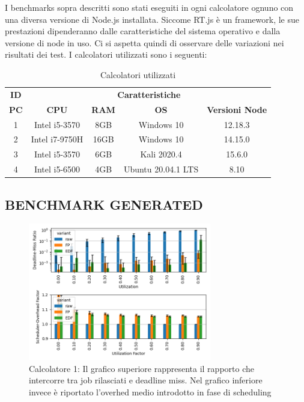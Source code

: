 \documentclass[conference]{IEEEtran}
\begin{document}
I benchmarks sopra descritti sono stati eseguiti in ogni calcolatore ognuno con una diversa versione di Node.js installata. Siccome RT.js è un framework, le sue prestazioni dipenderanno dalle caratteristiche del sistema operativo e dalla versione di node in uso. Ci si aspetta quindi di osservare delle variazioni nei risultati dei test.
\newline 
I calcolatori utilizzati sono i seguenti:
\begin{table}[htbp]
\begin{center}
\begin{tabular}{|c|c|c|c|c|}
\hline
\textbf{ID}&\multicolumn{4}{|c|}{\textbf{Caratteristiche}} \\
\cline{2-5} 
\textbf{PC} & \textbf{CPU} & \textbf{RAM} & \textbf{OS} & \textbf{Versioni Node} \\
\hline
1 & Intel i5-3570 & 8GB & Windows 10 & 12.18.3  \\
2 & Intel i7-9750H & 16GB & Windows 10 & 14.15.0 \\
3 & Intel i5-3570 & 6GB & Kali 2020.4 & 15.6.0 \\
4 & Intel i5-6500 & 4GB & Ubuntu 20.04.1 LTS & 8.10 \\
\hline
\end{tabular}
\caption{Calcolatori utilizzati}
\end{center}
\end{table}

    \subsection{BENCHMARK GENERATED}
    \begin{figure}[hbt!]
    \includegraphics[width=8cm]{generated_1.png}
    \centering
    \caption{Calcolatore 1: Il grafico superiore rappresenta il rapporto che intercorre tra job rilasciati e deadline miss. Nel grafico inferiore invece è riportato l'overhed medio introdotto in fase di scheduling}
    \end{figure}
    
\end{document}
